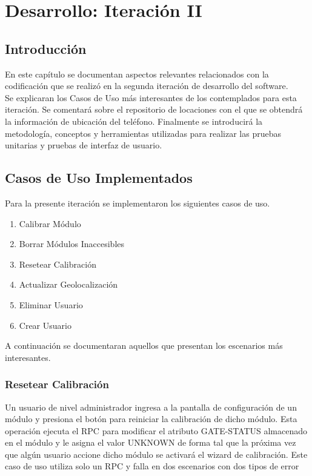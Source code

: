 
\chapter{Desarrollo: Iteración II} %

\label{Chapter7} %


\section{Introducción}
En este capítulo se documentan aspectos relevantes relacionados con la codificación que se realizó en la segunda iteración de desarrollo del software.\\
Se explicaran los Casos de Uso más interesantes de los contemplados para esta iteración.
Se comentará sobre el repositorio de locaciones con el que se obtendrá la información de ubicación del teléfono.
Finalmente se introducirá la metodología, conceptos y herramientas utilizadas para realizar las pruebas unitarias y pruebas de interfaz de usuario.

\section{Casos de Uso Implementados}
Para la presente iteración se implementaron los siguientes casos de uso.
\begin{enumerate}
	\item Calibrar Módulo
	\item Borrar Módulos Inaccesibles
	\item Resetear Calibración
	\item Actualizar Geolocalización
	\item Eliminar Usuario
	\item Crear Usuario
\end{enumerate}

A continuación se documentaran aquellos que presentan los escenarios más interesantes.

\subsection{Resetear Calibración}
Un usuario de nivel administrador ingresa a la pantalla de configuración de un módulo y presiona el botón 
para reiniciar la calibración de dicho módulo.
Esta operación ejecuta el RPC para modificar el atributo GATE-STATUS almacenado en el módulo y le asigna el valor UNKNOWN
de forma tal que la próxima vez que algún usuario accione dicho módulo se activará el wizard de calibración.
Este caso de uso utiliza solo un RPC y falla en dos escenarios con dos tipos de error

